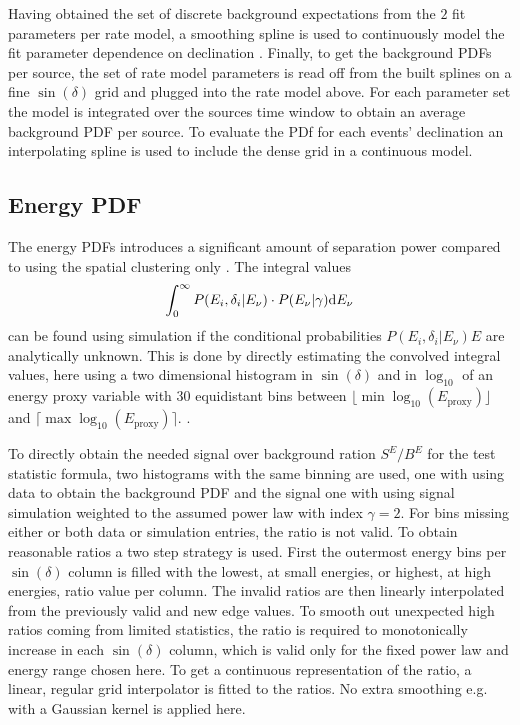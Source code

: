 Having obtained the set of discrete background expectations from the $2$ fit parameters per rate model, a smoothing spline is used to continuously model the fit parameter dependence on declination .
Finally, to get the background PDFs per source, the set of rate model parameters is read off from the built splines on a fine $\sin(\delta)$ grid and plugged into the rate model above.
For each parameter set the model is integrated over the sources time window to obtain an average background PDF per source.
To evaluate the PDf for each events' declination an interpolating spline is used to include the dense grid in a continuous model.

\subsection*{Energy PDF}
The energy PDFs introduces a significant amount of separation power compared to using the spatial clustering only .
The integral values
\begin{equation}
  \int_0^\infty P(E_i,\delta_i|E_\nu)\cdot P(E_\nu|\gamma) \mathrm{d}E_\nu
\end{equation}
can be found using simulation if the conditional probabilities $P(E_i,\delta_i|E_\nu)E$ are analytically unknown.
This is done by directly estimating the convolved integral values, here using a two dimensional histogram in $\sin(\delta)$ and in $\log_{10}$ of an energy proxy variable with $30$ equidistant bins between $\lfloor \min\log_{10}(E_\text{proxy}) \rfloor$ and $\lceil \max\log_{10}(E_\text{proxy}) \rceil$.
.

To directly obtain the needed signal over background ration $S^E / B^E$ for the test statistic formula, two histograms with the same binning are used, one with using data to obtain the background PDF and the signal one with using signal simulation weighted to the assumed power law with index $\gamma = 2$.
For bins missing either or both data or simulation entries, the ratio is not valid.
To obtain reasonable ratios a two step strategy is used.
First the outermost energy bins per $\sin(\delta)$ column is filled with the lowest, at small energies, or highest, at high energies, ratio value per column.
The invalid ratios are then linearly interpolated from the previously valid and new edge values.
To smooth out unexpected high ratios coming from limited statistics, the ratio is required to monotonically increase in each $\sin(\delta)$ column, which is valid only for the fixed power law and energy range chosen here.
To get a continuous representation of the ratio, a linear, regular grid interpolator is fitted to the ratios.
No extra smoothing e.g. with a Gaussian kernel is applied here.

